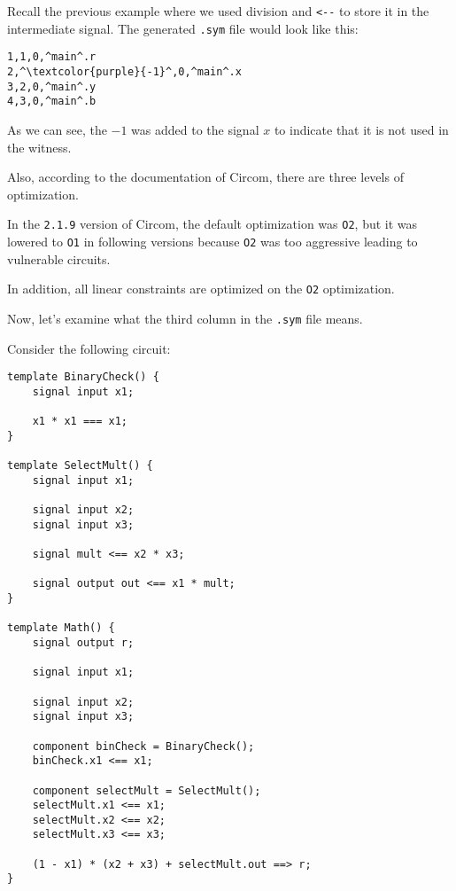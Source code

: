 \documentclass[../lecture-notes-148x210.tex]{subfiles}
\begin{document}
Recall the previous example where we used division and \texttt{<-{-}} to store it in the intermediate signal.
The generated \texttt{.sym} file would look like this:

\begin{center}
    \begin{tcolorbox}[enhanced,
        width=0.5\textwidth,
        title=\textbf{.sym file for $b \;\texttt{<-{-}}\; x/y, r \;\texttt{<==}\; by$},
        coltitle=gray!25!black,
        attach boxed title to top center={yshift=-2mm,yshifttext=-1mm},
        boxed title style={size=small,colframe=gray!75!black,
        colback=blue!30!white,boxrule=1pt},
        top=-0.35cm,
        bottom=-0.35cm]
        \begin{lstlisting}[language=Circom,numbers=none,basicstyle=\ttfamily\footnotesize,escapechar=^]
1,1,0,^main^.r
2,^\textcolor{purple}{-1}^,0,^main^.x
3,2,0,^main^.y
4,3,0,^main^.b
        \end{lstlisting}
    \end{tcolorbox}
\end{center}

As we can see, the $-1$ was added to the signal $x$ to indicate that it is not used in the witness.

Also, according to the documentation of Circom, there are three levels of optimization.

In the \texttt{2.1.9} version of Circom, the default optimization was \texttt{O2}, but it was lowered to \texttt{O1} in following versions because \texttt{O2} was too aggressive leading to vulnerable circuits.

\begin{remark}
    In addition, all linear constraints are optimized on the \texttt{O2} optimization.
\end{remark}

Now, let's examine what the third column in the \texttt{.sym} file means.

Consider the following circuit:

\begin{lstlisting}[language=Circom,basicstyle=\ttfamily\footnotesize]
template BinaryCheck() {
    signal input x1;

    x1 * x1 === x1;
}

template SelectMult() {
    signal input x1;

    signal input x2;
    signal input x3;

    signal mult <== x2 * x3;

    signal output out <== x1 * mult;
}

template Math() {
    signal output r;

    signal input x1;

    signal input x2;
    signal input x3;

    component binCheck = BinaryCheck();
    binCheck.x1 <== x1;

    component selectMult = SelectMult();
    selectMult.x1 <== x1;
    selectMult.x2 <== x2;
    selectMult.x3 <== x3;

    (1 - x1) * (x2 + x3) + selectMult.out ==> r;
}
\end{lstlisting}
\end{document}
